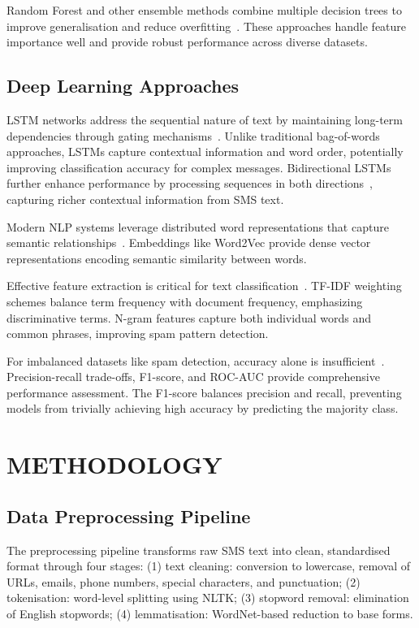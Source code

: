 \documentclass[a4paper,
               ]{jacow}
\begin{document}
Random Forest and other ensemble methods combine multiple decision trees to improve generalisation and reduce overfitting~\cite{breiman2001}. These approaches handle feature importance well and provide robust performance across diverse datasets.

\subsection{Deep Learning Approaches}

LSTM networks address the sequential nature of text by maintaining long-term dependencies through gating mechanisms~\cite{hochreiter1997}. Unlike traditional bag-of-words approaches, LSTMs capture contextual information and word order, potentially improving classification accuracy for complex messages. Bidirectional LSTMs further enhance performance by processing sequences in both directions~\cite{graves2013}, capturing richer contextual information from SMS text.

Modern NLP systems leverage distributed word representations that capture semantic relationships~\cite{mikolov2013}. Embeddings like Word2Vec provide dense vector representations encoding semantic similarity between words.

Effective feature extraction is critical for text classification~\cite{aggarwal2012}. TF-IDF weighting schemes balance term frequency with document frequency, emphasizing discriminative terms. N-gram features capture both individual words and common phrases, improving spam pattern detection.

For imbalanced datasets like spam detection, accuracy alone is insufficient~\cite{chawla2002}. Precision-recall trade-offs, F1-score, and ROC-AUC provide comprehensive performance assessment. The F1-score balances precision and recall, preventing models from trivially achieving high accuracy by predicting the majority class.

\section{METHODOLOGY}

\subsection{Data Preprocessing Pipeline}

The preprocessing pipeline transforms raw SMS text into clean, standardised format through four stages: (1) text cleaning: conversion to lowercase, removal of URLs, emails, phone numbers, special characters, and punctuation; (2) tokenisation: word-level splitting using NLTK; (3) stopword removal: elimination of English stopwords; (4) lemmatisation: WordNet-based reduction to base forms.
\end{document}
